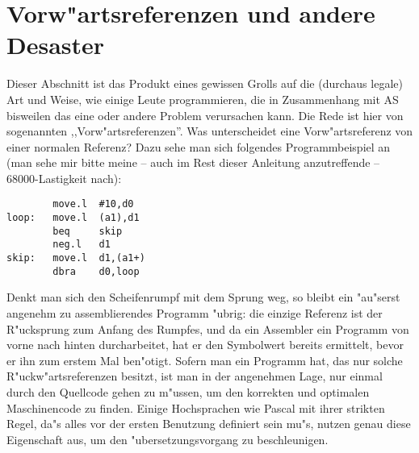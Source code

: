 \documentclass[12pt,a4paper,twoside]{report}
\begin{document}
\vspace{2mm}


\section{Vorw"artsreferenzen und andere Desaster}
\label{ForwRefs}

Dieser Abschnitt ist das Produkt eines gewissen Grolls auf die (durchaus
legale) Art und Weise, wie einige Leute programmieren, die in Zusammenhang
mit AS bisweilen das eine oder andere Problem verursachen kann.  Die Rede
ist hier von sogenannten ,,Vorw"artsreferenzen''.  Was unterscheidet eine
Vorw"artsreferenz von einer normalen Referenz?  Dazu sehe man sich folgendes
Programmbeispiel an (man sehe mir bitte meine -- auch im Rest dieser Anleitung
anzutreffende -- 68000-Lastigkeit nach):
\begin{verbatim}
        move.l  #10,d0
loop:   move.l  (a1),d1
        beq     skip
        neg.l   d1
skip:   move.l  d1,(a1+)
        dbra    d0,loop
\end{verbatim}
Denkt man sich den Scheifenrumpf mit dem Sprung weg, so bleibt ein
"au"serst angenehm zu assemblierendes Programm "ubrig: die einzige
Referenz ist der R"ucksprung zum Anfang des Rumpfes, und da ein
Assembler ein Programm von vorne nach hinten durcharbeitet, hat er
den Symbolwert bereits ermittelt, bevor er ihn zum erstem Mal ben"otigt.
Sofern man ein Programm hat, das nur solche R"uckw"artsreferenzen besitzt,
ist man in der angenehmen Lage, nur einmal durch den Quellcode gehen zu
m"ussen, um den korrekten und optimalen Maschinencode zu finden.  Einige
Hochsprachen wie Pascal mit ihrer strikten Regel, da"s alles vor der ersten
Benutzung definiert sein mu"s, nutzen genau diese Eigenschaft aus, um den
"ubersetzungsvorgang zu beschleunigen.
\end{document}
